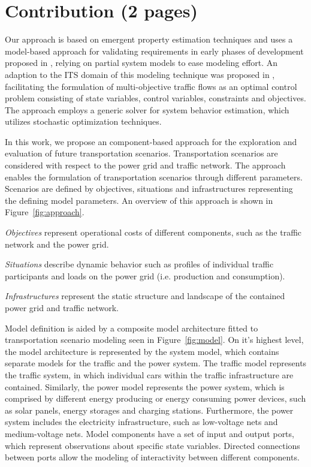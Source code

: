 \section{Contribution (2 pages)}

Our approach is based on emergent property estimation techniques \cite{hackenberg2012towards} and uses a model-based approach for validating requirements in early phases of development proposed in \cite{hackenberg2014rapid}, relying on partial system models to ease modeling effort. An adaption to the ITS domain of this modeling technique was proposed in \cite{ascher2014early}, facilitating the formulation of multi-objective traffic flows as an optimal control problem consisting of state variables, control variables, constraints and objectives. The approach employs a generic solver for system behavior estimation, which utilizes stochastic optimization techniques.

In this work, we propose an component-based approach for the exploration and evaluation of future transportation scenarios. Transportation scenarios are considered with respect to the power grid and traffic network. The approach enables the formulation of transportation scenarios through different parameters. Scenarios are defined by objectives, situations and infrastructures representing the defining model parameters. An overview of this approach is shown in Figure~\ref{fig:approach}. 

\textit{Objectives} represent operational costs of different components, such as the traffic network and the power grid. 

\textit{Situations} describe dynamic behavior such as profiles of individual traffic participants and loads on the power grid (i.e. production and consumption). 

\textit{Infrastructures} represent the static structure and landscape of the contained power grid and traffic network. 

Model definition is aided by a composite model architecture fitted to transportation scenario modeling seen in Figure~\ref{fig:model}. On it's highest level, the model architecture is represented by the system model, which contains separate models for the traffic and the power system. The traffic model represents the traffic system, in which individual cars within the traffic infrastructure are contained. Similarly, the power model represents the power system, which is comprised by different energy producing or energy consuming power devices, such as solar panels, energy storages and charging stations. Furthermore, the power system includes the electricity infrastructure, such as low-voltage nets and medium-voltage nets. Model components have a set of input and output ports, which represent observations about specific state variables. Directed connections between ports allow the modeling of interactivity between different components.

